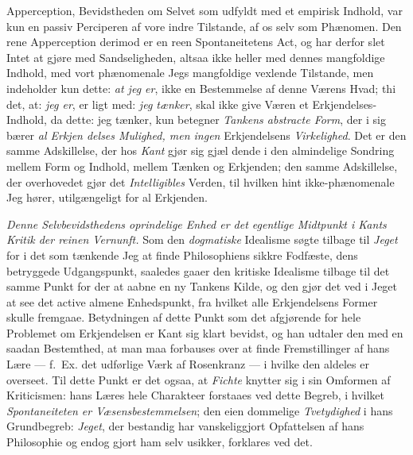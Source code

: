 Apperception, Bevidstheden om Selvet som udfyldt med et
empirisk Indhold, var kun en passiv Perciperen af vore indre
Tilstande, af os selv som Phænomen. Den rene Apperception
derimod er en reen Spontaneitetens Act, og har derfor slet
Intet at gjøre med Sandseligheden, altsaa ikke heller med
dennes mangfoldige Indhold, med vort phænomenale Jegs
mangfoldige vexlende Tilstande, men indeholder kun dette: \emph{at
jeg er}, ikke en Bestemmelse af denne Værens Hvad; thi det,
at: \emph{jeg er}, er ligt med: \emph{jeg tænker}, skal ikke give Væren
et Erkjendelses-Indhold, da dette: jeg tænker, kun betegner
\emph{Tankens abstracte Form}, der i sig bærer \emph{al Erkjen\-%
delses Mulighed, men ingen} Erkjendelsens \emph{Virkelighed}.
Det er den samme Adskillelse, der hos \emph{Kant} gjør sig gjæl\-%
dende i den almindelige Sondring mellem Form og Indhold,
mellem Tænken og Erkjenden; den samme Adskillelse, der
overhovedet gjør det \emph{Intelligibles} Verden, til hvilken hint
ikke-phænomenale Jeg hører, utilgængeligt for al Erkjenden.

\emph{Denne Selvbevidsthedens oprindelige Enhed er
det egentlige Midtpunkt i Kants Kritik der reinen
Vernunft.} Som den \emph{dogmatiske} Idealisme søgte tilbage
til \emph{Jeget} for i det som tænkende Jeg at finde Philosophiens
sikkre Fodfæste, dens betryggede Udgangspunkt, saaledes
gaaer den kritiske Idealisme tilbage til det samme Punkt for
der at aabne en ny Tankens Kilde, og den gjør det ved i
 Jeget at see det active almene Enhedspunkt, fra hvilket alle
Erkjendelsens Former skulle fremgaae. Betydningen af dette
Punkt som det afgjørende for hele Problemet om Erkjendelsen
er Kant sig klart bevidst, og han udtaler den med en saadan
Bestemthed, at man maa forbauses over at finde Fremstillinger
af hans Lære --- f.\ Ex. det udførlige Værk af Rosenkranz ---
i hvilke den aldeles er overseet. Til dette Punkt er det ogsaa,
at \emph{Fichte} knytter sig i sin Omformen af Kriticismen: hans
Læres hele Charakteer forstaaes ved dette Begreb, i hvilket
\emph{Spontaneiteten er Væsensbestemmelsen}; den eien\-%
dommelige \emph{Tvetydighed} i hans Grundbegreb: \emph{Jeget}, der
bestandig har vanskeliggjort Opfattelsen af hans Philosophie
og endog gjort ham selv usikker, forklares ved det.

